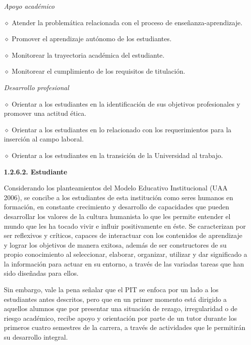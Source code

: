 \medskip
{\itshape Apoyo académico}

\begin{Obs}
\item[$\diamond$]  Atender la problemática relacionada con el proceso de
enseñanza-aprendizaje.
\item[$\diamond$] Promover el aprendizaje autónomo de los estudiantes.
\item[$\diamond$] Monitorear la trayectoria académica del estudiante.
\item[$\diamond$] Monitorear el cumplimiento de los requisitos de titulación.
\end{Obs}

\medskip
{\itshape Desarrollo profesional}

\begin{Obs}
\item[$\diamond$] Orientar a los estudiantes en la identificación de sus objetivos
profesionales y promover una actitud ética.
\item[$\diamond$] Orientar a los estudiantes en lo relacionado con los requerimientos para
la inserción al campo laboral.
\item[$\diamond$] Orientar a los estudiantes en la transición de la Universidad al trabajo.
\end{Obs}

\medskip 
{\bfseries 1.2.6.2. Estudiante}


Considerando los planteamientos del Modelo Educativo Institucional (UAA
2006), se concibe a los estudiantes de esta institución como seres humanos
en formación, en constante crecimiento y desarrollo de capacidades que
pueden desarrollar los valores de la cultura humanista lo que les permite
entender el mundo que les ha tocado vivir e influir positivamente en éste.
Se caracterizan por ser reflexivos y críticos, capaces de interactuar con
los contenidos de aprendizaje y lograr los objetivos de manera exitosa,
además de ser constructores de su propio conocimiento al seleccionar,
elaborar, organizar, utilizar y dar significado a la información para
actuar en su entorno, a través de las variadas tareas que han sido
diseñadas para ellos.

Sin embargo, vale la pena señalar que el PIT se enfoca por un lado a los
estudiantes antes descritos, pero que en un primer momento está dirigido a
aquellos alumnos que por presentar una situación de rezago, irregularidad o
de riesgo académico, recibe apoyo y orientación por parte de un tutor
durante los primeros cuatro semestres de la carrera, a través de
actividades que le permitirán su desarrollo integral.

